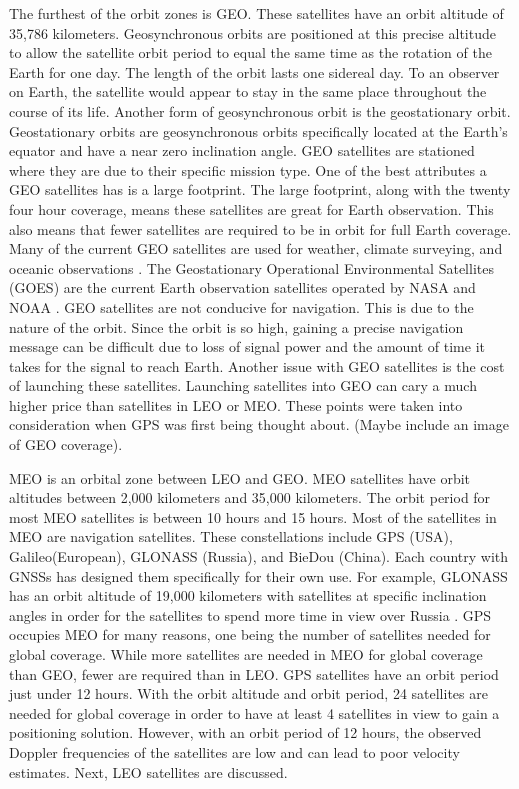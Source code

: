 \documentclass[12pt]{report}
\begin{document}
The furthest of the orbit zones is GEO. These satellites have an orbit altitude of 35,786 kilometers. Geosynchronous orbits are positioned at this precise altitude to allow the satellite orbit period to equal the same time as the rotation of the Earth for one day. The length of the orbit lasts one sidereal day. To an observer on Earth, the satellite would appear to stay in the same place throughout the course of its life. Another form of geosynchronous orbit is the geostationary orbit. Geostationary orbits are geosynchronous orbits specifically located at the Earth's equator and have a near zero inclination angle. GEO satellites are stationed where they are due to their specific mission type. One of the best attributes a GEO satellites has is a large footprint. The large footprint, along with the twenty four hour coverage, means these satellites are great for Earth observation. This also means that fewer satellites are required to be in orbit for full Earth coverage. Many of the current GEO satellites are used for weather, climate surveying, and oceanic observations \cite{usdepartmentofcommerceSatellites}. The Geostationary Operational Environmental Satellites (GOES) are the current Earth observation satellites operated by NASA and NOAA \cite{garnerGOESOverviewHistory2015}. GEO satellites are not conducive for navigation. This is due to the nature of the orbit. Since the orbit is so high, gaining a precise navigation message can be difficult due to loss of signal power and the amount of time it takes for the signal to reach Earth. Another issue with GEO satellites is the cost of launching these satellites. Launching satellites into GEO can cary a much higher price than satellites in LEO or MEO. These points were taken into consideration when GPS was first being thought about. (Maybe include an image of GEO coverage).

MEO is an orbital zone between LEO and GEO. MEO satellites have orbit altitudes between 2,000 kilometers and 35,000 kilometers. The orbit period for most MEO satellites is between 10 hours and 15 hours. Most of the satellites in MEO are navigation satellites. These constellations include GPS (USA), Galileo(European), GLONASS (Russia), and BieDou (China). Each country with GNSSs has designed them specifically for their own use. For example, GLONASS has an orbit altitude of 19,000 kilometers with satellites at specific inclination angles in order for the satellites to spend more time in view over Russia \cite{GLONASSInterfaceControl1998a}. GPS occupies MEO for many reasons, one being the number of satellites needed for global coverage. While more satellites are needed in MEO for global coverage than GEO, fewer are required than in LEO. GPS satellites have an orbit period just under 12 hours. With the orbit altitude and orbit period, 24 satellites are needed for global coverage in order to have at least 4 satellites in view to gain a positioning solution. However, with an orbit period of 12 hours, the observed Doppler frequencies of the satellites are low and can lead to poor velocity estimates. Next, LEO satellites are discussed.
\end{document}
